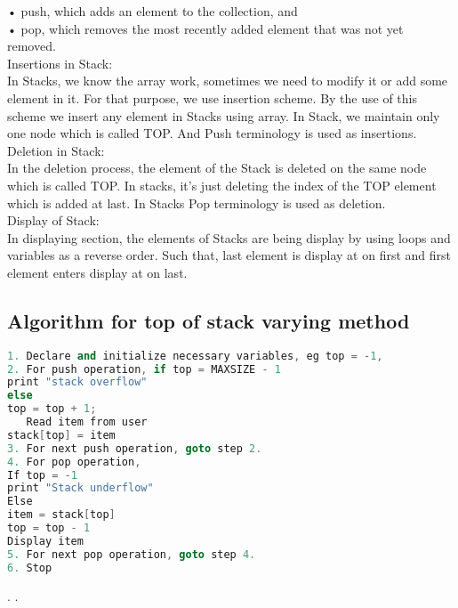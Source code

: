 \documentclass[11pt]{article}            %
\begin{document}
•	push, which adds an element to the collection, and\\
•	pop, which removes the most recently added element that was not yet removed.\\

Insertions in Stack:\\

 In Stacks, we know the array work, sometimes we need to modify it or add some element in it. For that purpose, we use insertion scheme. By the use of this scheme we insert any element in Stacks using array. In Stack, we maintain only one node which is called TOP. And Push terminology is used as insertions.\\
    
Deletion in Stack:\\

In the deletion process, the element of the Stack is deleted on the same node which is called TOP. In stacks, it’s just deleting the index of the TOP element which is added at last. In Stacks Pop terminology is used as deletion.\\    

Display of Stack:\\

In displaying section, the elements of Stacks are being display by using loops and variables as a reverse order. Such that, last element is display at on first and first element enters display at on last.\\


 \subsection{Algorithm for top of stack varying method}
\begin{lstlisting}[language=C++]
1. Declare and initialize necessary variables, eg top = -1,                   
2. For push operation, if top = MAXSIZE - 1 
print "stack overflow" 
else 
top = top + 1; 
   Read item from user 
stack[top] = item 
3. For next push operation, goto step 2. 
4. For pop operation, 
If top = -1      
print "Stack underflow" 
Else      
item = stack[top]       
top = top - 1       
Display item 
5. For next pop operation, goto step 4. 
6. Stop
\end{lstlisting}
.
.
\end{document}
